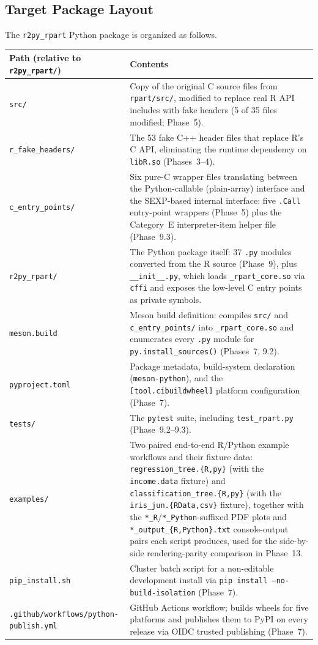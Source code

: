 \documentclass[12pt]{article}
\begin{document}
\subsection{Target Package Layout}
\label{sec:intro:layout}

The \texttt{r2py\_rpart} Python package is organized as follows.

\medskip
\begin{center}
\begin{tabular}{p{}p{}}
\toprule
Path (relative to \texttt{r2py\_rpart/}) & Contents \\
\midrule
\texttt{src/} & Copy of the original C source files from \texttt{rpart/src/}, modified to replace real R API includes with fake headers (5 of 35 files modified; Phase~5). \\
\texttt{r\_fake\_headers/} & The 53 fake C++ header files that replace R's C API, eliminating the runtime dependency on \texttt{libR.so} (Phases~3--4). \\
\texttt{c\_entry\_points/} & Six pure-C wrapper files translating between the Python-callable (plain-array) interface and the SEXP-based internal interface: five \texttt{.Call} entry-point wrappers (Phase~5) plus the Category~E interpreter-item helper file (Phase~9.3). \\
\texttt{r2py\_rpart/} & The Python package itself: 37 \texttt{.py} modules converted from the R source (Phase~9), plus \texttt{\_\_init\_\_.py}, which loads \texttt{\_rpart\_core.so} via \texttt{cffi} and exposes the low-level C entry points as private symbols. \\
\texttt{meson.build} & Meson build definition: compiles \texttt{src/} and \texttt{c\_entry\_points/} into \texttt{\_rpart\_core.so} and enumerates every \texttt{.py} module for \texttt{py.install\_sources()} (Phases~7, 9.2). \\
\texttt{pyproject.toml} & Package metadata, build-system declaration (\texttt{meson-python}), and the \texttt{[tool.cibuildwheel]} platform configuration (Phase~7). \\
\texttt{tests/} & The \texttt{pytest} suite, including \texttt{test\_rpart.py} (Phase~9.2--9.3). \\
\texttt{examples/} & Two paired end-to-end R/Python example workflows and their fixture data: \texttt{regression\_tree.\{R,py\}} (with the \texttt{income.data} fixture) and \texttt{classification\_tree.\{R,py\}} (with the \texttt{iris\_jun.\{RData,csv\}} fixture), together with the \texttt{*\_R}/\texttt{*\_Python}-suffixed PDF plots and \texttt{*\_output\_\{R,Python\}.txt} console-output pairs each script produces, used for the side-by-side rendering-parity comparison in Phase~13. \\
\texttt{pip\_install.sh} & Cluster batch script for a non-editable development install via \texttt{pip install --no-build-isolation} (Phase~7). \\
\texttt{.github/workflows/python-publish.yml} & GitHub Actions workflow; builds wheels for five platforms and publishes them to PyPI on every release via OIDC trusted publishing (Phase~7). \\
\bottomrule
\end{tabular}
\end{center}
\medskip
\end{document}
